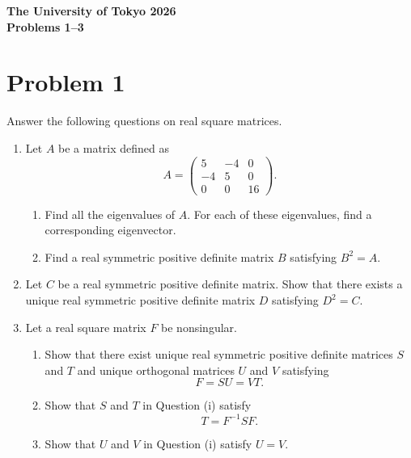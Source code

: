 \documentclass[10pt,a4paper]{article}
\begin{document}
\begin{center}
  {\Large \textbf{The University of Tokyo 2026}}\\[2mm]
  {\large \textbf{Problems 1--3}}
\end{center}

\section*{Problem 1}

Answer the following questions on real square matrices.

\begin{enumerate}
  \item Let $A$ be a matrix defined as
        \[
          A=
          \begin{pmatrix}
            5 & -4 & 0\\
            -4 & 5 & 0\\
            0 & 0 & 16
          \end{pmatrix}.
        \]
        \begin{enumerate}
          \item Find all the eigenvalues of $A$. For each of these eigenvalues, find a corresponding eigenvector.
          \item Find a real symmetric positive definite matrix $B$ satisfying $B^2=A$.
        \end{enumerate}

  \item Let $C$ be a real symmetric positive definite matrix. Show that there exists a unique real symmetric positive definite matrix $D$ satisfying $D^2=C$.

  \item Let a real square matrix $F$ be nonsingular.
        \begin{enumerate}
          \item Show that there exist unique real symmetric positive definite matrices $S$ and $T$ and unique orthogonal matrices $U$ and $V$ satisfying
                \[
                  F=SU=VT.
                \]
          \item Show that $S$ and $T$ in Question (i) satisfy
                \[
                  T=F^{-1}SF.
                \]
          \item Show that $U$ and $V$ in Question (i) satisfy $U=V$.
        \end{enumerate}
\end{enumerate}
\end{document}

